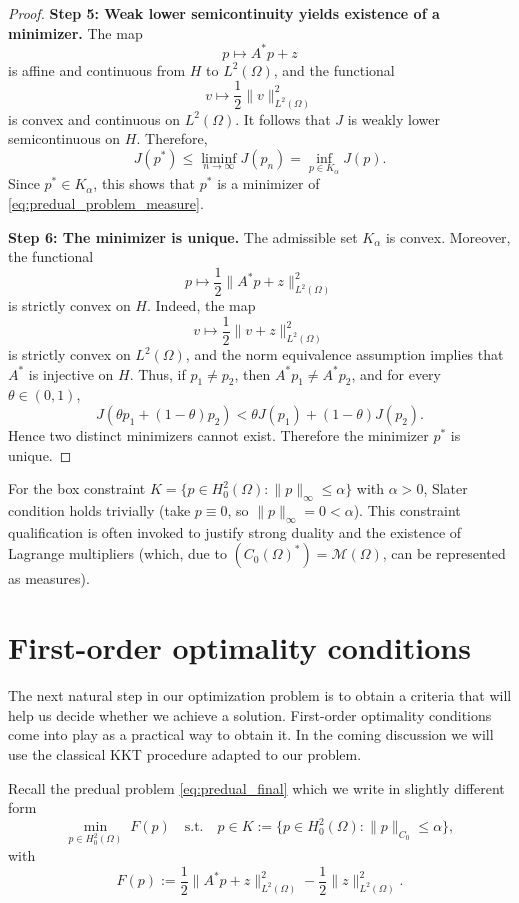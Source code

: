\documentclass[11pt,a4paper]{article}
\begin{document}
\begin{proof}
\medskip
\noindent\textbf{Step 5: Weak lower semicontinuity yields existence of a minimizer.}
The map
\[
p\mapsto A^*p+z
\]
is affine and continuous from $H$ to $L^2(\Omega)$, and the functional
\[
v\mapsto \frac12\|v\|_{L^2(\Omega)}^2
\]
is convex and continuous on $L^2(\Omega)$. It follows that $J$ is weakly lower semicontinuous on $H$. Therefore,
\[
J(p^*)
\le \liminf_{n\to\infty} J(p_n)
= \inf_{p\in K_\alpha} J(p).
\]
Since $p^*\in K_\alpha$, this shows that $p^*$ is a minimizer of \eqref{eq:predual_problem_measure}.

\medskip
\noindent\textbf{Step 6: The minimizer is unique.}
The admissible set $K_\alpha$ is convex. Moreover, the functional
\[
p\mapsto \frac12\|A^*p+z\|_{L^2(\Omega)}^2
\]
is strictly convex on $H$. Indeed, the map
\[
v\mapsto \frac12\|v+z\|_{L^2(\Omega)}^2
\]
is strictly convex on $L^2(\Omega)$, and the norm equivalence assumption implies that $A^*$ is injective on $H$. Thus, if $p_1\neq p_2$, then $A^*p_1\neq A^*p_2$, and for every $\theta\in(0,1)$,
\[
J(\theta p_1+(1-\theta)p_2)
<
\theta J(p_1)+(1-\theta)J(p_2).
\]
Hence two distinct minimizers cannot exist. Therefore the minimizer $p^*$ is unique.
\end{proof}

\begin{remark}
For the box constraint $K=\{p\in H_0^2(\Omega):\|p\|_\infty\le \alpha\}$ with $\alpha>0$,
Slater condition holds trivially (take $p\equiv 0$, so $\|p\|_\infty=0<\alpha$).
This constraint qualification is often invoked to justify strong duality and the existence
of Lagrange multipliers (which, due to $(C_0(\Omega)^*)=\mathcal M(\Omega)$, can be represented
as measures).
\end{remark}

\section{First-order optimality conditions}\label{sec:KKT}
The next natural step in our optimization problem is to obtain a criteria that will help us decide whether we achieve a solution. First-order optimality conditions come into play as a practical way to obtain it. In the coming discussion we will use the classical KKT procedure adapted to our problem.

Recall the predual problem \ref{eq:predual_final} which we write in slightly different form
\[
\label{eq:PM_star}
\tag{$P_M^*$}
\min_{p\in H^2_0(\Omega)}\;
F(p)
\quad\text{s.t.}\quad p\in K:=\{p\in H^2_0(\Omega):\|p\|_{C_0}\le \alpha\},
\]
with
\[
F(p):=\frac12\|A^*p+z\|_{L^2(\Omega)}^2-\frac12\|z\|_{L^2(\Omega)}^2 .
\]
\end{document}
